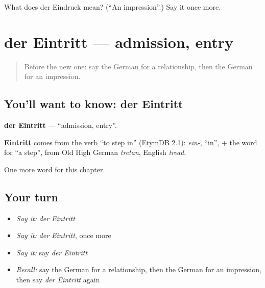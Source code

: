 \begin{tcolorbox}[breakable,colback=teal!4,colframe=teal!35!black,title={Before you move on}]
What does der Eindruck mean? (\textquotedblleft{}An impression\textquotedblright{}.) Say it once more.
\end{tcolorbox}
\section[der Eintritt]{der Eintritt — admission, entry}

\label{lesson:GE-C227-eintritt}



\begin{quote}
Before the new one: say the German for a relationship, then the German for an impression.
\end{quote}

\subsection*{You'll want to know: der Eintritt}
\textbf{der Eintritt} — \textquotedblleft{}admission, entry\textquotedblright{}.

\begin{cousinweb}
\textbf{Eintritt} comes from the verb \textquotedblleft{}to step in\textquotedblright{} (EtymDB 2.1): \emph{ein-}, \textquotedblleft{}in\textquotedblright{}, + the word for \textquotedblleft{}a step\textquotedblright{}, from Old High German \emph{tretan}, English \emph{tread}.
\end{cousinweb}

\begin{grammarlens}[title={What you've built}]
One more word for this chapter.
\end{grammarlens}

\subsection*{Your turn}
\begin{itemize}
\raggedright
  \item \emph{Say it:} \emph{der Eintritt}
  \item \emph{Say it:} \emph{der Eintritt}, once more
  \item \emph{Say it:} say \emph{der Eintritt}
  \item \emph{Recall:} say the German for a relationship, then the German for an impression, then say \emph{der Eintritt} again
\end{itemize}


